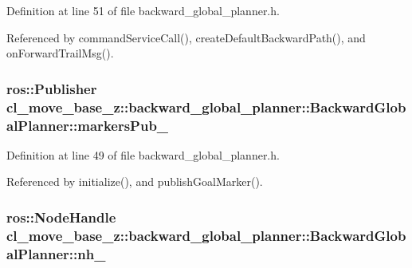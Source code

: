 Definition at line 51 of file backward\+\_\+global\+\_\+planner.\+h.



Referenced by command\+Service\+Call(), create\+Default\+Backward\+Path(), and on\+Forward\+Trail\+Msg().

\subsubsection[{\texorpdfstring{markers\+Pub\+\_\+}{markersPub_}}]{\setlength{\rightskip}{0pt plus 5cm}ros\+::\+Publisher cl\+\_\+move\+\_\+base\+\_\+z\+::backward\+\_\+global\+\_\+planner\+::\+Backward\+Global\+Planner\+::markers\+Pub\+\_\+\hspace{0.3cm}{\ttfamily [private]}}\hypertarget{classcl__move__base__z_1_1backward__global__planner_1_1BackwardGlobalPlanner_a6f80f7041c8cdc93e1f3dfd0e723654a}{}\label{classcl__move__base__z_1_1backward__global__planner_1_1BackwardGlobalPlanner_a6f80f7041c8cdc93e1f3dfd0e723654a}


Definition at line 49 of file backward\+\_\+global\+\_\+planner.\+h.



Referenced by initialize(), and publish\+Goal\+Marker().

\subsubsection[{\texorpdfstring{nh\+\_\+}{nh_}}]{\setlength{\rightskip}{0pt plus 5cm}ros\+::\+Node\+Handle cl\+\_\+move\+\_\+base\+\_\+z\+::backward\+\_\+global\+\_\+planner\+::\+Backward\+Global\+Planner\+::nh\+\_\+\hspace{0.3cm}{\ttfamily [private]}}\hypertarget{classcl__move__base__z_1_1backward__global__planner_1_1BackwardGlobalPlanner_adeb0df38d8dcde919b732724420a401f}{}\label{classcl__move__base__z_1_1backward__global__planner_1_1BackwardGlobalPlanner_adeb0df38d8dcde919b732724420a401f}


